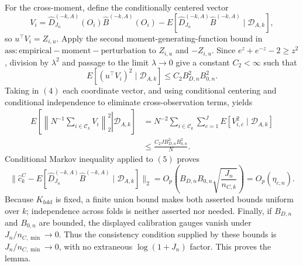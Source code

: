 For the cross-moment, define the conditionally centered vector
\[
 V_i=\widehat D_{J_n}^{(-k,A)}(O_i)\widehat B^{(-k,A)}(O_i)
 -E[\widehat D_{J_n}^{(-k,A)}\widehat B^{(-k,A)}\mid\mathcal D_{A,k}],
\]
so \(u^\top V_i=Z_{i,u}\).  Apply the second moment-generating-function bound in \(\mathrm{ass:empirical-moment-perturbation}\) to \(Z_{i,u}\) and \(-Z_{i,u}\).  Since \(e^z+e^{-z}-2\ge z^2\), division by \(\lambda^2\) and passage to the limit \(\lambda\to0\) give a constant \(C_2<\infty\) such that
\[
 E[(u^\top V_i)^2\mid\mathcal D_{A,k}]
 \le C_2B_{D,n}^2B_{0,n}^2. \tag{4}
\]
Taking in \((4)\) each coordinate vector, and using conditional centering and conditional independence to eliminate cross-observation terms, yields
\[
 \begin{aligned}
 E\!\left[\left.\left\|N^{-1}\sum_{i\in\mathcal C_k}V_i\right\|_2^2
 \right|\mathcal D_{A,k}\right]
 &=N^{-2}\sum_{i\in\mathcal C_k}\sum_{c=1}^J
 E[V_{i,c}^2\mid\mathcal D_{A,k}]\\
 &\le \frac{C_2JB_{D,n}^2B_{0,n}^2}{N}.
 \end{aligned} \tag{5}
\]
Conditional Markov inequality applied to \((5)\) proves
\[
 \|\widehat c_k^C-E[\widehat D_{J_n}^{(-k,A)}\widehat B^{(-k,A)}
 \mid\mathcal D_{A,k}]\|_2
 =O_p\!\left(B_{D,n}B_{0,n}\sqrt{\frac{J_n}{n_{C,k}}}\right)
 =O_p(\eta_{c,n}).
\]
Because \(K_{\mathrm{fold}}\) is fixed, a finite union bound makes both asserted bounds uniform over \(k\); independence across folds is neither asserted nor needed.  Finally, if \(B_{D,n}\) and \(B_{0,n}\) are bounded, the displayed calibration gauges vanish under \(J_n/n_{C,\min}\to0\).  Thus the consistency condition supplied by these bounds is \(J_n/n_{C,\min}\to0\), with no extraneous \(\log(1+J_n)\) factor.  This proves the lemma.
